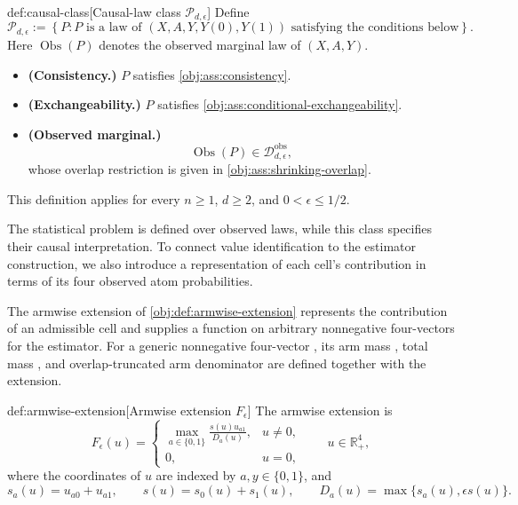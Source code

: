 \begin{definitionv}{def:causal-class}[Causal-law class \(\mathcal P_{d,\epsilon}\)]
Define
\[
\mathcal P_{d,\epsilon}
:=
\left\{
P:
P\text{ is a law of }(X,A,Y,Y(0),Y(1))
\text{ satisfying the conditions below}
\right\}.
\]
Here \(\operatorname{Obs}(P)\) denotes the observed marginal law of \((X,A,Y)\).
\begin{itemize}
\item \textbf{(Consistency.)} \(P\) satisfies \cref{obj:ass:consistency}.
\item \textbf{(Exchangeability.)} \(P\) satisfies \cref{obj:ass:conditional-exchangeability}.
\item \textbf{(Observed marginal.)}
\[
\operatorname{Obs}(P)\in\mathcal D_{d,\epsilon}^{\mathrm{obs}},
\]
whose overlap restriction is given in \cref{obj:ass:shrinking-overlap}.
\end{itemize}
This definition applies for every \(n\ge1\), \(d\ge2\), and \(0<\epsilon\le1/2\).
\end{definitionv}

The statistical problem is defined over observed laws, while this class specifies their causal interpretation. To connect value identification to the estimator construction, we also introduce a representation of each cell's contribution in terms of its four observed atom probabilities.



The armwise extension  of \cref{obj:def:armwise-extension} represents the contribution of an admissible cell and supplies a function on arbitrary nonnegative four-vectors for the estimator. For a generic nonnegative four-vector , its arm mass , total mass , and overlap-truncated arm denominator  are defined together with the extension.

\begin{definitionv}{def:armwise-extension}[Armwise extension \(F_\epsilon\)]
The armwise extension is
\[
F_\epsilon(u)
=
\begin{cases}
\displaystyle
\max_{a\in\{0,1\}}\frac{s(u)u_{a1}}{D_a(u)},&u\ne0,\\[6pt]
0,&u=0,
\end{cases}
\qquad u\in\mathbb R_+^4,
\]
where the coordinates of \(u\) are indexed by \(a,y\in\{0,1\}\), and
\[
s_a(u)=u_{a0}+u_{a1},
\qquad
s(u)=s_0(u)+s_1(u),
\qquad
D_a(u)=\max\{s_a(u),\epsilon s(u)\}.
\]
\end{definitionv}

